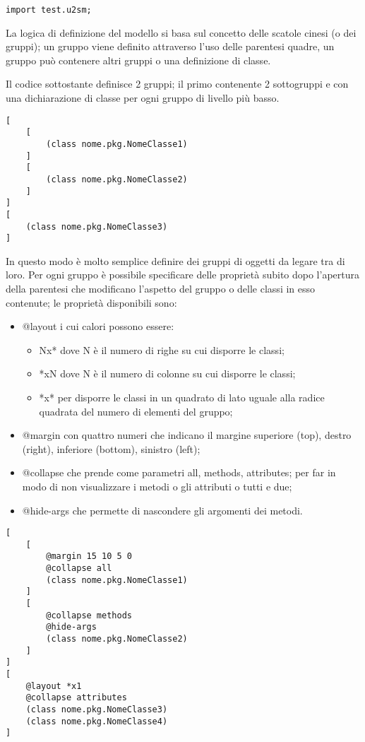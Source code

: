 \begin{lstlisting}[caption={Import dei modelli necessari}, style={layout}] 
import test.u2sm;
\end{lstlisting}

La logica di definizione del modello si basa sul concetto delle scatole cinesi (o
dei gruppi); un gruppo viene definito attraverso l'uso delle parentesi quadre,
un gruppo può contenere altri gruppi o una definizione di classe.

Il codice sottostante definisce 2 gruppi; il primo contenente 2 sottogruppi e
 con una dichiarazione di classe per ogni gruppo di livello più basso.

\begin{lstlisting}[caption={Un semplice diagramma}, style={layout}] 
[
	[
		(class nome.pkg.NomeClasse1)
	]
	[
		(class nome.pkg.NomeClasse2)
	]
]
[
	(class nome.pkg.NomeClasse3)
]
\end{lstlisting}

In questo modo è molto semplice definire dei gruppi di oggetti da legare tra di
loro. Per ogni gruppo è possibile specificare delle proprietà subito dopo
l'apertura della parentesi che modificano l'aspetto del gruppo o delle classi in
esso contenute; le proprietà disponibili sono:

\begin{itemize}
  \item @layout i cui calori possono essere:
  \begin{itemize}
  	\item Nx* dove N è il numero di righe su cui disporre le classi;
  	\item *xN dove N è il numero di colonne su cui disporre le classi;
  	\item *x* per disporre le classi in un quadrato di lato uguale alla radice
  	quadrata del numero di elementi del gruppo;
  \end{itemize}
  
  \item @margin con quattro numeri che indicano il margine superiore (top),
  destro (right), inferiore (bottom), sinistro (left);
  \item @collapse che prende come parametri all, methods, attributes; per far in
  modo di non visualizzare i metodi o gli attributi o tutti e due;
  \item @hide-args che permette di nascondere gli argomenti dei metodi.
\end{itemize}

\begin{lstlisting}[caption={Diagramma decorato di attributi}, style={layout}] 
[
	[	
		@margin 15 10 5 0
		@collapse all
		(class nome.pkg.NomeClasse1)
	]
	[
		@collapse methods
		@hide-args
		(class nome.pkg.NomeClasse2)
	]
]
[
	@layout *x1
	@collapse attributes
	(class nome.pkg.NomeClasse3)
	(class nome.pkg.NomeClasse4)
]
\end{lstlisting}



